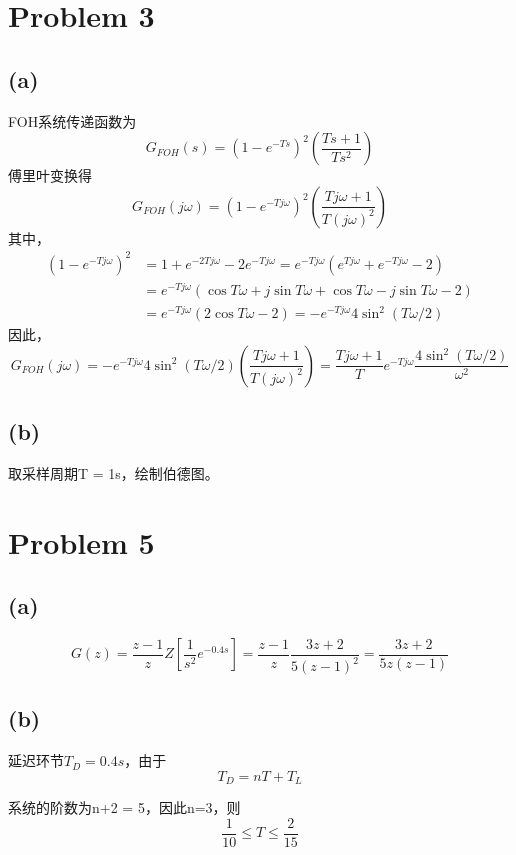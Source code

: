 \documentclass{myrep}
\begin{document}

\section*{Problem 3}
\subsection*{(a)}
FOH系统传递函数为
\begin{equation}
	G_{FOH}(s) = (1-e^{-Ts})^2\left(\frac{Ts+1}{Ts^2}\right)
\end{equation}
傅里叶变换得
\begin{equation}
	G_{FOH}(j\omega) = (1-e^{-Tj\omega})^2\left(\frac{Tj\omega+1}{T(j\omega)^2}\right)
\end{equation}
其中，
\begin{align}
	(1-e^{-Tj\omega})^2 &= 1+e^{-2Tj\omega} - 2e^{-Tj\omega} = e^{-Tj\omega}(e^{Tj\omega}+e^{-Tj\omega}-2)\\
	& = e^{-Tj\omega}(\cos T\omega + j\sin T\omega +\cos T\omega - j\sin T\omega-2)\\
	& = e^{-Tj\omega}(2\cos T\omega-2) = -e^{-Tj\omega}4\sin^2(T\omega/2)
\end{align}
因此，
\begin{equation}
	G_{FOH}(j\omega) = -e^{-Tj\omega}4\sin^2(T\omega/2)\left(\frac{Tj\omega+1}{T(j\omega)^2}\right) = \dfrac{Tj\omega+1}{T}e^{-Tj\omega}\dfrac{4\sin^2(T\omega/2)}{\omega^2}
\end{equation}

\subsection*{(b)}
取采样周期T = 1s，绘制伯德图。

\section*{Problem 5}
\subsection*{(a)}
\begin{equation}
	G(z) = \dfrac{z-1}{z}Z\left[\dfrac{1}{s^2}e^{-0.4s}\right] = \dfrac{z-1}{z}\dfrac{3z+2}{5(z-1)^2} = \dfrac{3z+2}{5z(z-1)}
\end{equation}
\subsection*{(b)}
延迟环节$T_D = 0.4s$，由于
\begin{equation}
	T_D = nT + T_L
\end{equation}

系统的阶数为n+2 = 5，因此n=3，则
\begin{equation}
	\frac{1}{10} \leq T \leq \frac{2}{15}
\end{equation}

\end{document}
